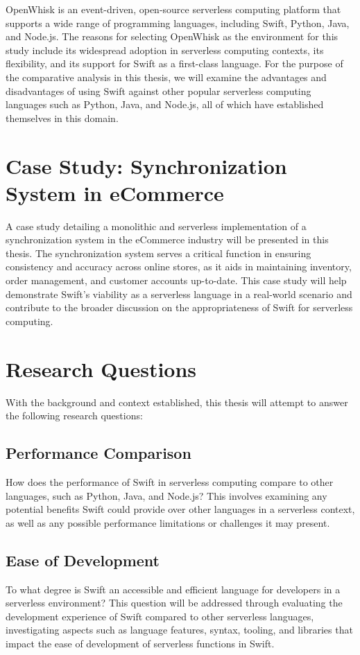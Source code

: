 OpenWhisk is an event-driven, open-source serverless computing platform that supports a wide range of programming languages, including Swift, Python, Java, and Node.js. The reasons for selecting OpenWhisk as the environment for this study include its widespread adoption in serverless computing contexts, its flexibility, and its support for Swift as a first-class language. For the purpose of the comparative analysis in this thesis, we will examine the advantages and disadvantages of using Swift against other popular serverless computing languages such as Python, Java, and Node.js, all of which have established themselves in this domain.

\section{Case Study: Synchronization System in eCommerce}

A case study detailing a monolithic and serverless implementation of a synchronization system in the eCommerce industry will be presented in this thesis. The synchronization system serves a critical function in ensuring consistency and accuracy across online stores, as it aids in maintaining inventory, order management, and customer accounts up-to-date. This case study will help demonstrate Swift's viability as a serverless language in a real-world scenario and contribute to the broader discussion on the appropriateness of Swift for serverless computing.

\section{Research Questions}
With the background and context established, this thesis will attempt to answer the following research questions:

\subsection{Performance Comparison}
How does the performance of Swift in serverless computing compare to other languages, such as Python, Java, and Node.js? This involves examining any potential benefits Swift could provide over other languages in a serverless context, as well as any possible performance limitations or challenges it may present.

\subsection{Ease of Development}
To what degree is Swift an accessible and efficient language for developers in a serverless environment? This question will be addressed through evaluating the development experience of Swift compared to other serverless languages, investigating aspects such as language features, syntax, tooling, and libraries that impact the ease of development of serverless functions in Swift.

